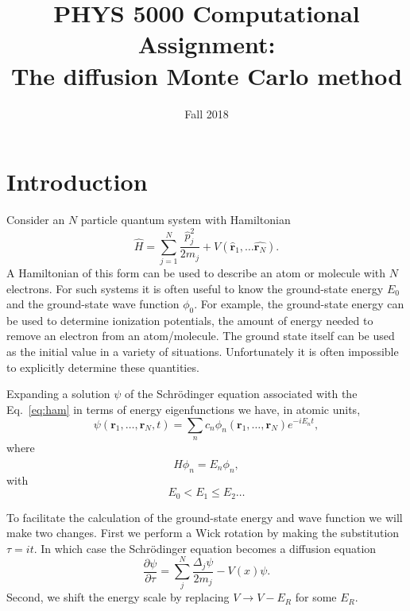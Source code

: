 \documentclass[letterpaper, 11 pt]{article}
\title{PHYS 5000 Computational Assignment:\\The diffusion Monte Carlo method}
\date{Fall 2018}
\author{}
\begin{document}
\maketitle

\section*{Introduction}

Consider an $N$ particle quantum system with Hamiltonian
%
\begin{equation} \label{eq:ham}
   \hat{H} = \sum\limits_{j = 1}^N \frac{\hat{p}^2_j}{2m_j} + V(\hat{\mathbf{r}}_1, \dots
   \hat{\mathbf{r}_N}).
\end{equation}
%
A Hamiltonian of this form can be used to describe an atom or molecule with $N$ electrons. For such
systems it is often useful to know the ground-state energy $E_0$ and the ground-state wave function
$\phi_0$. For example, the ground-state energy can be used to determine ionization potentials, the
amount of energy needed to remove an electron from an atom/molecule. The ground state itself can be used
as the initial value in a variety of situations. Unfortunately it is often impossible to explicitly
determine these quantities.

Expanding a solution $\psi$ of the Schr\"odinger equation associated with the Eq.~\eqref{eq:ham} in terms
of energy eigenfunctions we have, in atomic units,
%
\begin{equation} \label{eq:expansion}
   \psi(\mathbf{r}_1,\dots,\mathbf{r}_N,t) = \sum_n c_n \phi_n(\mathbf{r}_1,\dots,\mathbf{r}_N)
   e^{-i E_n t},
\end{equation}
%
where
%
\begin{equation}
   \hat{H} \phi_n = E_n \phi_n,
\end{equation}
%
with
%
\begin{equation}
   E_0 < E_1 \leq E_2 \dots
\end{equation}

To facilitate the calculation of the ground-state energy and wave function we will make two changes.
First we perform a Wick rotation by making the substitution $\tau = it$. In which case the Schr\"odinger
equation becomes a diffusion equation
%
\begin{equation}
   \frac{\partial \psi}{\partial \tau} = \sum_j^N \frac{\Delta_j \psi}{2m_j} - V(x) \psi.
\end{equation}
%
Second, we shift the energy scale by replacing $V \rightarrow V - E_R$ for some $E_R$.
\end{document}

